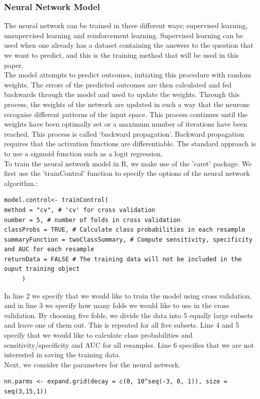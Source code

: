      \subsubsection{Neural Network Model}
        \noindent The neural network can be trained in three different ways; supervised learning, unsupervised learning and reinforcement learning. Supervised learning can be used when one already has a dataset containing the answers to the question that we want to predict, and this is the training method that will be used in this paper.\\
     The model attempts to predict outcomes, initiating this procedure with random weights. The errors of the predicted outcomes are then calculated and fed backwards through the model and used to update the weights. Through this process, the weights of the network are updated in such a way that the neurons recognise different patterns of the input space. This process continues until the weights have been optimally set or a maximum number of iterations have been reached. This process is called ‘backward propagation’. Backward propagation requires that the activation functions are differentiable. The standard approach is to use a sigmoid function such as a logit regression.\\
     [\baselineskip]\indent To train the neural network model in R, we make use of the 'caret' package. We first use the 'trainControl' function to specify the options of the neural network algorithm.:
     \begin{lstlisting}
model.control<- trainControl(
method = "cv", # 'cv' for cross validation
number = 5, # number of folds in cross validation
classProbs = TRUE, # Calculate class probabilities in each resample
summaryFunction = twoClassSummary, # Compute sensitivity, specificity and AUC for each resample
returnData = FALSE # The training data will not be included in the ouput training object
     )
     \end{lstlisting}
     \indent In line 2 we specify that we would like to train the model using cross validation, and in line 3 we specify how many folds we would like to use in the cross validation. By choosing five folds, we divide the data into 5 equally large subsets and leave one of them out. This is repeated for all five subsets. Line 4 and 5 specify that we would like to calculate class probabilities and sensitivity/specificity and AUC for all resamples. Line 6 specifies that we are not interested in saving the training data.\\
     Next, we consider the parameters for the neural network.
     \begin{lstlisting}
nn.parms <- expand.grid(decay = c(0, 10^seq(-3, 0, 1)), size = seq(3,15,1))
     \end{lstlisting}
     
